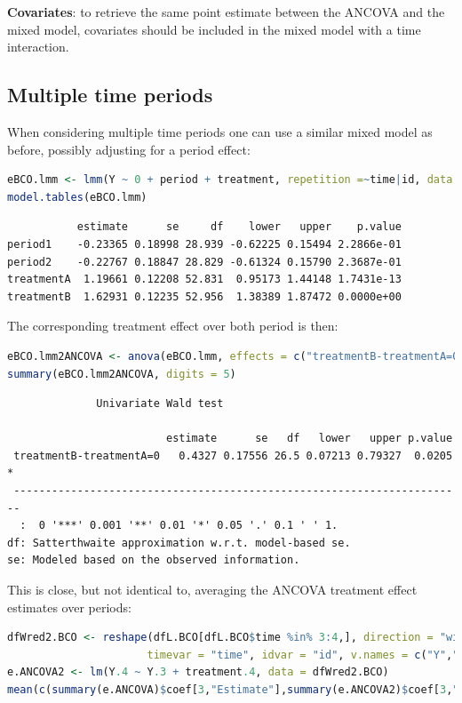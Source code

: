 \documentclass[12pt]{article}
\begin{document}
\textbf{Covariates}: to retrieve the same point estimate between the ANCOVA
and the mixed model, covariates should be included in the mixed model
with a time interaction.
\subsection{Multiple time periods}
\label{sec:orgcf3dcd6}

When considering multiple time periods one can use a similar mixed
model as before, possibly adjusting for a period effect:
\begin{lstlisting}[language=r,numbers=none]
eBCO.lmm <- lmm(Y ~ 0 + period + treatment, repetition =~time|id, data = dfL.BCO)
model.tables(eBCO.lmm)
\end{lstlisting}

\label{}
\begin{verbatim}
           estimate      se     df    lower   upper    p.value
period1    -0.23365 0.18998 28.939 -0.62225 0.15494 2.2866e-01
period2    -0.22767 0.18847 28.829 -0.61324 0.15790 2.3687e-01
treatmentA  1.19661 0.12208 52.831  0.95173 1.44148 1.7431e-13
treatmentB  1.62931 0.12235 52.956  1.38389 1.87472 0.0000e+00
\end{verbatim}


The corresponding treatment effect over both period is then:
\begin{lstlisting}[language=r,numbers=none]
eBCO.lmm2ANCOVA <- anova(eBCO.lmm, effects = c("treatmentB-treatmentA=0"), multivariate=FALSE)
summary(eBCO.lmm2ANCOVA, digits = 5)
\end{lstlisting}

\label{}
\begin{verbatim}
              Univariate Wald test 

                         estimate      se   df   lower   upper p.value  
 treatmentB-treatmentA=0   0.4327 0.17556 26.5 0.07213 0.79327  0.0205 *
 ----------------------------------------------------------------------- 
  :  0 '***' 0.001 '**' 0.01 '*' 0.05 '.' 0.1 ' ' 1.
df: Satterthwaite approximation w.r.t. model-based se. 
se: Modeled based on the observed information.
\end{verbatim}


This is close, but not identical to, averaging the ANCOVA treatment
effect estimates over periods:
\begin{lstlisting}[language=r,numbers=none]
dfWred2.BCO <- reshape(dfL.BCO[dfL.BCO$time %in% 3:4,], direction = "wide",
                      timevar = "time", idvar = "id", v.names = c("Y","treatment"))
e.ANCOVA2 <- lm(Y.4 ~ Y.3 + treatment.4, data = dfWred2.BCO)
mean(c(summary(e.ANCOVA)$coef[3,"Estimate"],summary(e.ANCOVA2)$coef[3,"Estimate"]))
\end{lstlisting}
\end{document}

